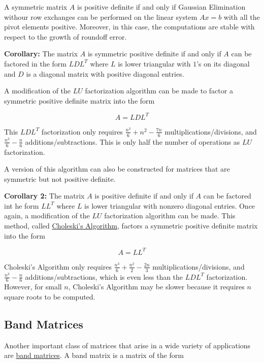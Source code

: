 A symmetric matrix $A$ is positive definite if and only if Gaussian Elimination
withour row exchanges can be performed on the linear system $Ax=b$ with
all the pivot elements positive. Moreover, in this case, the computations are
stable with respect to the growth of roundoff error.

\textbf{Corollary:} The matrix $A$ is symmetric positive definite if and only if
$A$ can be factored in the form $LDL^T$ where $L$ is lower triangular with $1$'s
on its diagonal and $D$ is a diagonal matrix with positive diagonal entries.

A modification of the $LU$ factorization algorithm can be made to factor a
symmetric positive definite matrix into the form

\begin{equation*}
  A = LDL^T
\end{equation*}

This $LDL^T$ factorization only requires $\frac{n^3}{6}+n^2 - \frac{7n}{6}$ 
multiplications/divisions, and $\frac{n^3}{6}-\frac{n}{6}$ additions/subtractions.
This is only half the number of operations as $LU$ factorization.

A version of this algorithm can also be constructed for matrices that are
symmetric but not positive definite.

\textbf{Corollary 2:} The matrix $A$ is positive definite if and only if $A$ can
be factored int he form $LL^T$ where $L$ is lower triangular with nonzero
diagonal entries. Once again, a modification of the $LU$ factorization algorithm
can be made. This method, called \uline{Choleski's Algorithm}, factors a
symmetric positive definite matrix into the form

\begin{equation*}
  A = LL^T
\end{equation*}

Choleski's Algorithm only requires $\frac{n^3}{6} + \frac{n^2}{2} - \frac{2n}{3}$
multiplications/divisions, and $\frac{n^3}{6}-\frac{n}{6}$ additions/subtractions,
which is even less than the $LDL^T$ factorization. However, for small $n$,
Choleski's Algorithm may be slower because it requires $n$ square roots to
be computed.

\subsection{Band Matrices}

Another important class of matrices that arise in a wide variety of applications
are \uline{band matrices}. A band matrix is a matrix of the form
 
